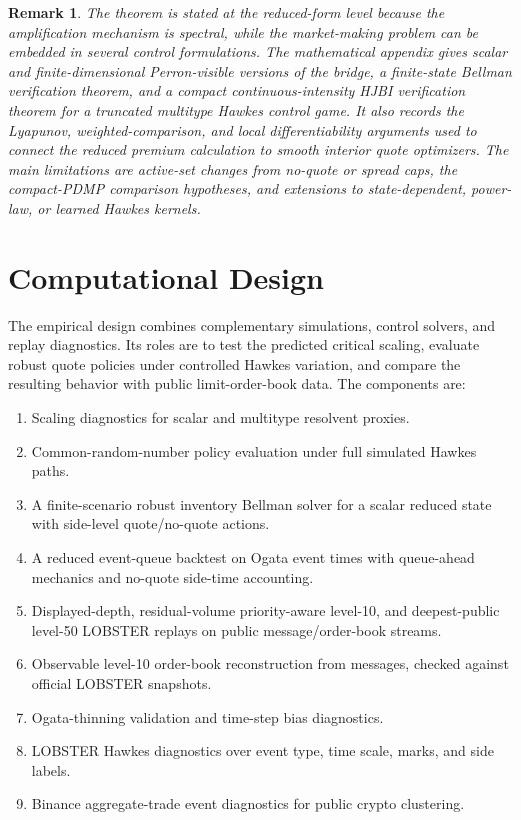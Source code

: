 \documentclass[11pt]{article}
\newtheorem{remark}{Remark}
\begin{document}
\begin{remark}
The theorem is stated at the reduced-form level because the amplification
mechanism is spectral, while the market-making problem can be embedded in
several control formulations. The mathematical appendix gives scalar and
finite-dimensional Perron-visible versions of the bridge, a finite-state
Bellman verification theorem, and a compact continuous-intensity HJBI
verification theorem for a truncated multitype Hawkes control game. It also
records the Lyapunov, weighted-comparison, and local differentiability
arguments used to connect the reduced premium calculation to smooth interior
quote optimizers. The main limitations are active-set changes from no-quote or
spread caps, the compact-PDMP comparison hypotheses, and extensions to
state-dependent, power-law, or learned Hawkes kernels.
\end{remark}

\section{Computational Design}

The empirical design combines complementary simulations, control solvers, and
replay diagnostics. Its roles are to test the predicted critical scaling,
evaluate robust quote policies under controlled Hawkes variation, and compare
the resulting behavior with public limit-order-book data. The components are:

\begin{enumerate}[nosep]
\item Scaling diagnostics for scalar and multitype resolvent proxies.
\item Common-random-number policy evaluation under full simulated Hawkes paths.
\item A finite-scenario robust inventory Bellman solver for a scalar reduced
state with side-level quote/no-quote actions.
\item A reduced event-queue backtest on Ogata event times with queue-ahead
mechanics and no-quote side-time accounting.
\item Displayed-depth, residual-volume priority-aware level-10, and
deepest-public level-50 LOBSTER replays on public message/order-book streams.
\item Observable level-10 order-book reconstruction from messages, checked
against official LOBSTER snapshots.
\item Ogata-thinning validation and time-step bias diagnostics.
\item LOBSTER Hawkes diagnostics over event type, time scale, marks, and side
labels.
\item Binance aggregate-trade event diagnostics for public crypto clustering.
\end{enumerate}
\end{document}
